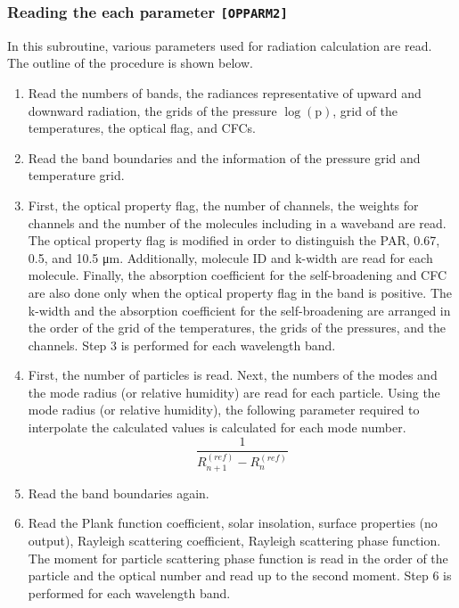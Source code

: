 \hypertarget{reading-the-each-parameter-opparm2}{%
\subsubsection{\texorpdfstring{Reading the each parameter
\texttt{{[}OPPARM2{]}}}{Reading the each parameter {[}OPPARM2{]}}}\label{reading-the-each-parameter-opparm2}}

In this subroutine, various parameters used for radiation calculation
are read. The outline of the procedure is shown below.

\begin{enumerate}
\def\labelenumi{\arabic{enumi}.}
\item
  Read the numbers of bands, the radiances representative of upward and
  downward radiation, the grids of the pressure \(\log (\mathrm{p})\),
  grid of the temperatures, the optical flag, and CFCs.
\item
  Read the band boundaries and the information of the pressure grid and
  temperature grid.
\item
  First, the optical property flag, the number of channels, the weights
  for channels and the number of the molecules including in a waveband
  are read. The optical property flag is modified in order to
  distinguish the PAR, 0.67, 0.5, and 10.5 μm. Additionally, molecule ID
  and k-width are read for each molecule. Finally, the absorption
  coefficient for the self-broadening and CFC are also done only when
  the optical property flag in the band is positive. The k-width and the
  absorption coefficient for the self-broadening are arranged in the
  order of the grid of the temperatures, the grids of the pressures, and
  the channels. Step 3 is performed for each wavelength band.
\item
  First, the number of particles is read. Next, the numbers of the modes
  and the mode radius (or relative humidity) are read for each particle.
  Using the mode radius (or relative humidity), the following parameter
  required to interpolate the calculated values is calculated for each
  mode number. \begin{equation}
  \frac{1}{R_{n+1}^{(r e f)}-R_{n}^{(r e f)}}
  \end{equation}
\item
  Read the band boundaries again.
\item
  Read the Plank function coefficient, solar insolation, surface
  properties (no output), Rayleigh scattering coefficient, Rayleigh
  scattering phase function. The moment for particle scattering phase
  function is read in the order of the particle and the optical number
  and read up to the second moment. Step 6 is performed for each
  wavelength band.
\end{enumerate}

